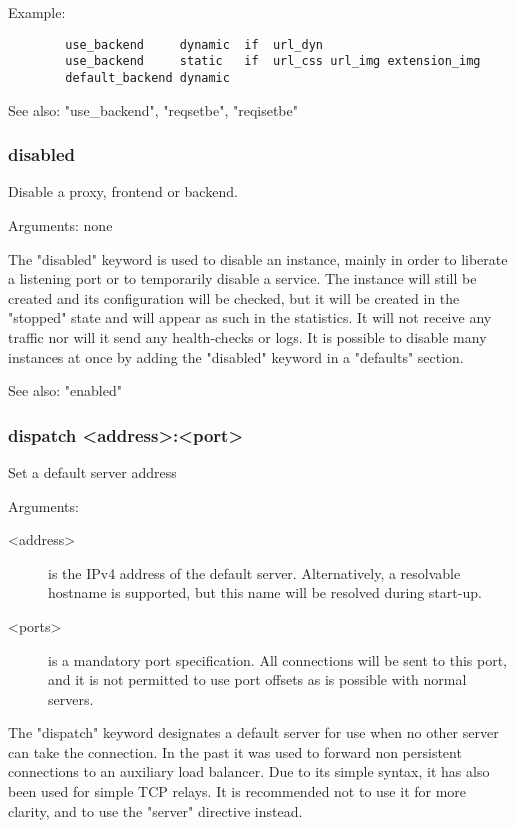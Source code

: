   Example:
  \begin{verbatim}
        use_backend     dynamic  if  url_dyn
        use_backend     static   if  url_css url_img extension_img
        default_backend dynamic
  \end{verbatim}

  See also: "use\_backend", "reqsetbe", "reqisetbe"

\subsubsection[disabled]{disabled}
  Disable a proxy, frontend or backend.
  

  Arguments: none

  The "disabled" keyword is used to disable an instance, mainly in order to
  liberate a listening port or to temporarily disable a service. The instance
  will still be created and its configuration will be checked, but it will be
  created in the "stopped" state and will appear as such in the statistics. It
  will not receive any traffic nor will it send any health-checks or logs. It
  is possible to disable many instances at once by adding the "disabled"
  keyword in a "defaults" section.

  See also: "enabled"

\subsubsection[dispatch]{dispatch <address>:<port>}
  Set a default server address
  
  
  Arguments:
  \begin{description}
  \item[<address>] is the IPv4 address of the default server. Alternatively, a
              resolvable hostname is supported, but this name will be resolved
              during start-up.

  \item[<ports>]   is a mandatory port specification. All connections will be sent
              to this port, and it is not permitted to use port offsets as is
              possible with normal servers.
  \end{description}

  The "dispatch" keyword designates a default server for use when no other
  server can take the connection. In the past it was used to forward non
  persistent connections to an auxiliary load balancer. Due to its simple
  syntax, it has also been used for simple TCP relays. It is recommended not to
  use it for more clarity, and to use the "server" directive instead.

